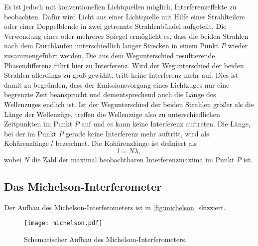Es ist jedoch mit konventionellen Lichtquellen möglich, Interferenzeffekte zu beobachten. Dafür wird Licht aus einer 
Lichtquelle mit Hilfe eines Strahlteilers oder einer Doppelblende in zwei getrennte Strahlenbündel aufgeteilt. Die 
Verwendung eines oder mehrerer Spiegel ermöglicht es, dass die beiden Strahlen nach dem Durchlaufen unterschiedlich 
langer Strecken in einem Punkt $P$ wieder zusammengeführt werden. Die aus dem Wegunterschied resultierende 
Phasendifferenz führt hier zu Interferenz. 
Wird der Wegunterschied der beiden Strahlen allerdings zu groß gewählt, tritt keine Interferenz mehr auf. Dies ist damit
zu begründen, dass der Emissionsvorgang eines Lichtzuges nur eine begrenzte Zeit beansprucht und dementsprechend auch die
Länge des Wellenzuges endlich ist. Ist der Wegunterschied der beiden Strahlen größer als die Länge der Wellenzüge, treffen
die Wellenzüge also zu unterschiedlichen Zeitpunkten im Punkt $P$ auf und es kann keine Interferenz auftreten. Die
Länge, bei der im Punkt $P$ gerade keine Interferenz mehr auftritt, wird als Kohärenzlänge $l$ bezeichnet. 
Die Kohärenzlänge ist definiert als
\begin{equation}
    l = N \lambda ,
\end{equation}
wobei $N$ die Zahl der maximal beobachtbaren Interferenzmaxima im Punkt $P$ ist. 

\subsection{Das Michelson-Interferometer}
\label{ssec:Michelson}

Der Aufbau des Michelson-Interferometers ist in \autoref{fig:michelson} skizziert. 

\begin{figure}
    \centering
    \texttt{[image: michelson.pdf]}
    \caption{Schematischer Aufbau des Michelson-Interferometers.}
    \label{fig:michelson}
  \end{figure}


